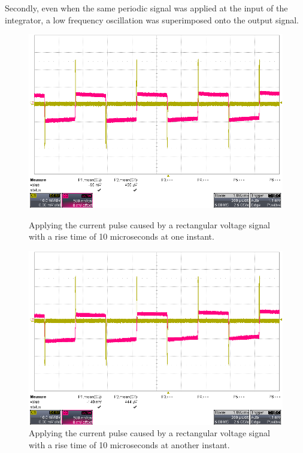 Secondly, even when the same periodic signal was applied at the input of the integrator, a low frequency oscillation was superimposed onto the output signal.
\begin{figure}[htbp]
 \centering
 \begin{minipage}{0.4\textwidth}
 \includegraphics[scale=0.12]{figures/Results/Integrator_measurements/currentwave_10u}
 \caption[Kurze Abbildungsbeschreibung]{Applying the current pulse caused by a rectangular voltage signal with a rise time of 10 microseconds at one instant. }
 \end{minipage}\qquad
 \begin{minipage}{0.4\textwidth}
 \includegraphics[scale=0.12]{figures/Results/Integrator_measurements/cuwave_10u-4}
 \caption[Kurze Abbildungsbeschreibung]{Applying the current pulse caused by a rectangular voltage signal with a rise time of 10 microseconds at another instant.}
 \end{minipage}
 
  
\end{figure}

